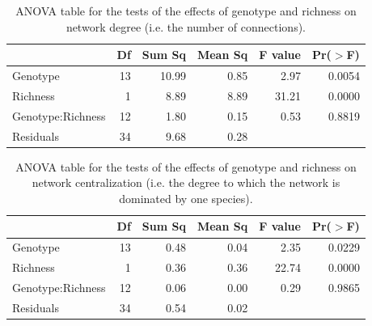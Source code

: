 \documentclass[11pt]{amsart}
\begin{document}
\begin{center} 
\begin{table}[ht]
\begin{center}
\begin{tabular}{lrrrrr}
  \hline
 & Df & Sum Sq & Mean Sq & F value & Pr($>$F) \\ 
  \hline
Genotype          & 13 & 10.99 & 0.85 & 2.97 & 0.0054 \\ 
  Richness          & 1 & 8.89 & 8.89 & 31.21 & 0.0000 \\ 
  Genotype:Richness & 12 & 1.80 & 0.15 & 0.53 & 0.8819 \\ 
  Residuals         & 34 & 9.68 & 0.28 &  &  \\ 
   \hline
\end{tabular}
\caption{ANOVA table for the tests of the effects of genotype and richness on network degree (i.e. the number of connections).}
\end{center}
\end{table}\end{center} 

\begin{center} 
\begin{table}[ht]
\begin{center}
\begin{tabular}{lrrrrr}
  \hline
 & Df & Sum Sq & Mean Sq & F value & Pr($>$F) \\ 
  \hline
Genotype          & 13 & 0.48 & 0.04 & 2.35 & 0.0229 \\ 
  Richness          & 1 & 0.36 & 0.36 & 22.74 & 0.0000 \\ 
  Genotype:Richness & 12 & 0.06 & 0.00 & 0.29 & 0.9865 \\ 
  Residuals         & 34 & 0.54 & 0.02 &  &  \\ 
   \hline
\end{tabular}
\caption{ANOVA table for the tests of the effects of genotype and richness on network centralization (i.e. the degree to which the network is dominated by one species).}
\end{center}
\end{table}\end{center} 

\pagebreak
\end{document}
